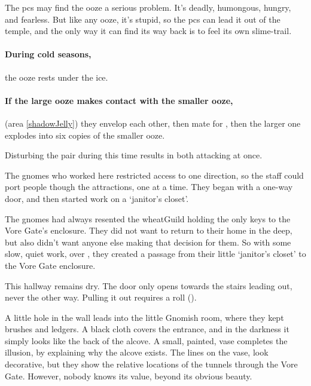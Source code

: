 \begin{multicols}{2}
\uncommonlyLargeJelly

The \glspl{pc} may find the ooze a serious problem.
It's deadly, humongous, hungry, and fearless.
But like any ooze, it's stupid, so the \glspl{pc} can lead it out of the temple, and the only way it can find its way back is to feel its own slime-trail.

\paragraph{During cold seasons,}
the ooze rests under the ice.

\paragraph{If the large ooze makes contact with the smaller ooze,}
(area \vref{shadowJelly})
they envelop each other, then mate for , then the larger one explodes into six copies of the smaller ooze.

Disturbing the pair during this time results in  both attacking at once.


\begin{exampletext}
  The gnomes who worked here restricted access to one direction, so the staff could port people though the attractions, one at a time.
  They began with a one-way door, and then started work on a `janitor's closet'.

  The gnomes had always resented the \gls{wheatGuild} holding the only keys to the Vore Gate's enclosure.
  They did not want to return to their home in the \gls{deep}, but also didn't want anyone else making that decision for them.
  So with some slow, quiet work, over , they created a passage from their little `janitor's closet' to the Vore Gate enclosure.
\end{exampletext}

This hallway remains dry.
The door only opens towards the stairs leading out, never the other way.
Pulling it out requires a  roll (\tn[11]).

A little hole in the wall leads into the little Gnomish room, where they kept brushes and ledgers.
A black cloth covers the entrance, and in the darkness it simply looks like the back of the alcove.
A small, painted, vase completes the illusion, by explaining why the alcove exists.
The lines on the vase, look decorative, but they show the relative locations of the tunnels through the Vore Gate.
However, nobody knows its value, beyond its obvious beauty.


\end{multicols}
